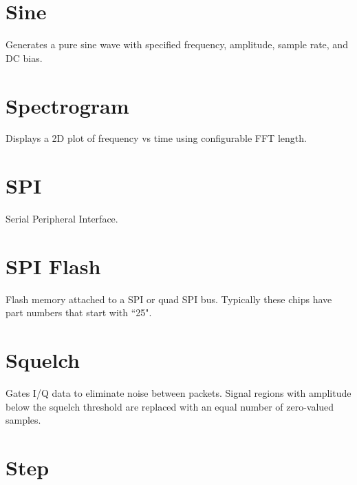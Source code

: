\pagebreak
\section{Sine}

Generates a pure sine wave with specified frequency, amplitude, sample rate, and DC bias.

\pagebreak
\section{Spectrogram}

Displays a 2D plot of frequency vs time using configurable FFT length.

\pagebreak
\section{SPI}

Serial Peripheral Interface.

\pagebreak
\section{SPI Flash}

Flash memory attached to a SPI or quad SPI bus. Typically these chips have part numbers that start with ``25".

\pagebreak
\section{Squelch}

Gates I/Q data to eliminate noise between packets. Signal regions with amplitude below the squelch threshold are
replaced with an equal number of zero-valued samples.

\pagebreak
\section{Step}

